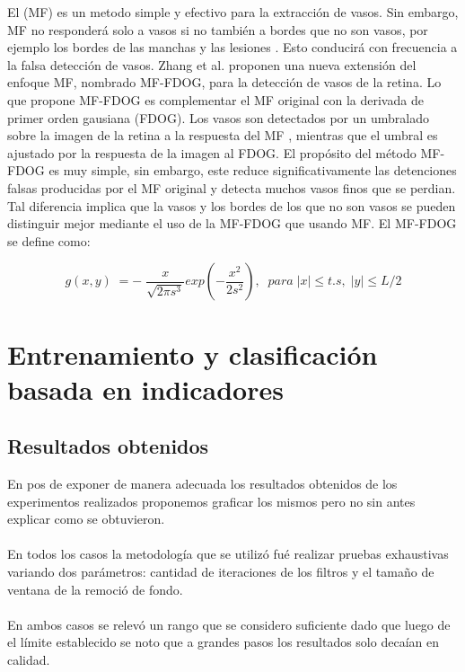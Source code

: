 El (MF) es un metodo simple y efectivo para  la extracción de vasos. Sin embargo, MF no responderá solo a vasos si no también a bordes que no son vasos, por ejemplo los bordes de las manchas y las lesiones . Esto conducirá con frecuencia a la falsa detección de vasos. Zhang et al. \cite{zhang2010retinal} proponen una nueva extensión del enfoque MF, nombrado MF-FDOG, para la detección de vasos de la retina. Lo que propone MF-FDOG es complementar el MF original con la derivada de primer orden gausiana (FDOG). Los vasos son detectados por un umbralado sobre la imagen de la retina a la respuesta del MF , mientras que el umbral es ajustado por la respuesta de la imagen al FDOG. El propósito del método  MF-FDOG  es muy simple, sin embargo, este reduce significativamente las detenciones falsas producidas por el MF original y detecta muchos vasos finos que se perdian.  Tal diferencia implica que la vasos y los bordes de los que no son vasos se pueden distinguir mejor mediante el uso de la MF-FDOG que usando MF. El MF-FDOG se define como:

\begin{displaymath}
g(x,y)\;=-\;\frac x{\sqrt{2\pi s^3}}exp(-\frac{x^2}{2s^2}),\;\;para\;\left|x\right|\leq t.s,\;\left|y\right|\leq L/2
\end{displaymath}


\section{Entrenamiento y clasificaci\'on basada en indicadores}


\subsection{Resultados obtenidos}

En pos de exponer de manera adecuada los resultados obtenidos de los experimentos realizados proponemos graficar los mismos pero no sin antes explicar como se obtuvieron.
\paragraph{}
En todos los casos la metodolog\'ia que se utiliz\'o fu\'e realizar pruebas exhaustivas variando dos par\'ametros: cantidad de iteraciones de los filtros y el tamaño de ventana de la remoci\'o de fondo.
\paragraph{}
En ambos casos se relev\'o un rango que se considero suficiente dado que luego de el límite establecido se noto que a grandes pasos los resultados solo deca\'ian en calidad.

